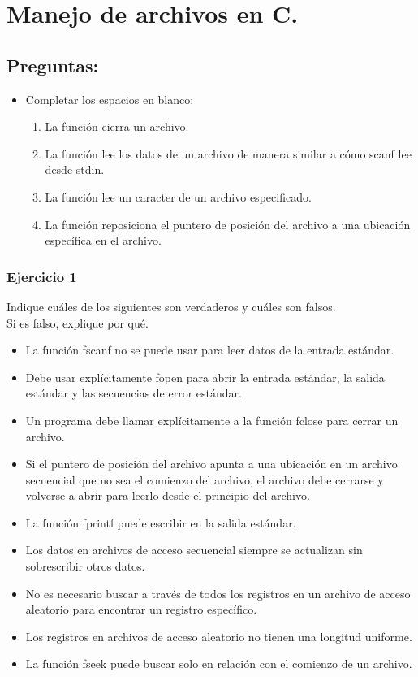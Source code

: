 \section{Manejo de archivos en C.}
\setcounter{subsection}{10}

\subsection*{Preguntas:}
\begin{itemize}[a)]
  \item Completar los espacios en blanco:\\
    \begin{enumerate}
      \item La función \underspace cierra un archivo.
      \item La función \underspace lee los datos de un archivo de manera similar a cómo scanf lee desde stdin.
      \item La función \underspace lee un caracter de un archivo especificado.
      \item La función \underspace reposiciona el puntero de posición del archivo a una ubicación específica en el archivo.
    \end{enumerate}
\end{itemize}
\subsubsection{Ejercicio 1}
Indique cuáles de los siguientes son verdaderos y cuáles son falsos.\\
Si es falso, explique por qué.
\begin{itemize}[a)]
  \item La función fscanf no se puede usar para leer datos de la entrada estándar.
  \item Debe usar explícitamente fopen para abrir la entrada estándar, la salida estándar y las secuencias de error estándar.
  \item Un programa debe llamar explícitamente a la función fclose para cerrar un archivo.
  \item Si el puntero de posición del archivo apunta a una ubicación en un archivo secuencial que no sea el comienzo del archivo, el archivo debe cerrarse y volverse a abrir para leerlo desde el principio del archivo.
  \item La función fprintf puede escribir en la salida estándar.
  \item Los datos en archivos de acceso secuencial siempre se actualizan sin sobrescribir otros datos.
  \item No es necesario buscar a través de todos los registros en un archivo de acceso aleatorio para encontrar un registro específico.
  \item Los registros en archivos de acceso aleatorio no tienen una longitud uniforme.
  \item La función fseek puede buscar solo en relación con el comienzo de un archivo.
\end{itemize}



